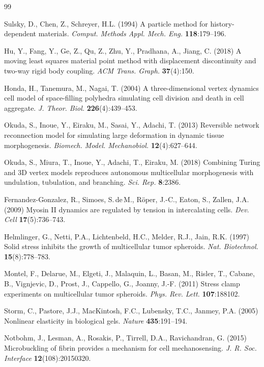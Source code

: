 \documentclass[10pt,a4paper]{article}
\begin{document}
{\small
\begin{thebibliography}{99}\setlength{\itemsep}{0pt}

 Sulsky, D., Chen, Z., Schreyer, H.L. (1994) A particle method for
history-dependent materials. \emph{Comput. Methods Appl. Mech. Eng.} \textbf{118}:179--196.

 Hu, Y., Fang, Y., Ge, Z., Qu, Z., Zhu, Y., Pradhana, A., Jiang, C. (2018) A moving
least squares material point method with displacement discontinuity and two-way rigid body coupling.
\emph{ACM Trans. Graph.} \textbf{37}(4):150.

 Honda, H., Tanemura, M., Nagai, T. (2004) A three-dimensional vertex dynamics
cell model of space-filling polyhedra simulating cell division and death in cell aggregate.
\emph{J. Theor. Biol.} \textbf{226}(4):439--453.

 Okuda, S., Inoue, Y., Eiraku, M., Sasai, Y., Adachi, T. (2013) Reversible network
reconnection model for simulating large deformation in dynamic tissue morphogenesis.
\emph{Biomech. Model. Mechanobiol.} \textbf{12}(4):627--644.

 Okuda, S., Miura, T., Inoue, Y., Adachi, T., Eiraku, M. (2018) Combining Turing
and 3D vertex models reproduces autonomous multicellular morphogenesis with undulation, tubulation,
and branching. \emph{Sci. Rep.} \textbf{8}:2386.

 Fernandez-Gonzalez, R., Simoes, S.\,de\,M., R\"oper, J.-C., Eaton, S.,
Zallen, J.A. (2009) Myosin II dynamics are regulated by tension in intercalating cells.
\emph{Dev. Cell} \textbf{17}(5):736--743.

 Helmlinger, G., Netti, P.A., Lichtenbeld, H.C., Melder, R.J., Jain, R.K.
(1997) Solid stress inhibits the growth of multicellular tumor spheroids.
\emph{Nat. Biotechnol.} \textbf{15}(8):778--783.

 Montel, F., Delarue, M., Elgeti, J., Malaquin, L., Basan, M., Risler, T.,
Cabane, B., Vignjevic, D., Prost, J., Cappello, G., Joanny, J.-F. (2011) Stress clamp experiments on
multicellular tumor spheroids. \emph{Phys. Rev. Lett.} \textbf{107}:188102.

 Storm, C., Pastore, J.J., MacKintosh, F.C., Lubensky, T.C., Janmey, P.A. (2005)
Nonlinear elasticity in biological gels. \emph{Nature} \textbf{435}:191--194.

 Notbohm, J., Lesman, A., Rosakis, P., Tirrell, D.A., Ravichandran, G. (2015)
Microbuckling of fibrin provides a mechanism for cell mechanosensing.
\emph{J. R. Soc. Interface} \textbf{12}(108):20150320.


\end{thebibliography}}
\end{document}

